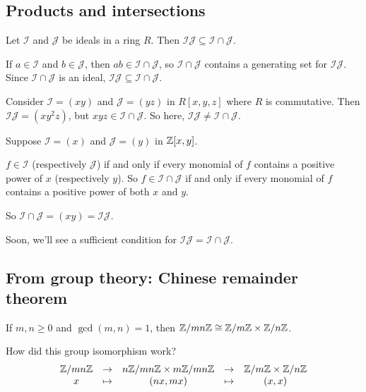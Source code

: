 \documentclass[12pt,letterpaper]{report}
\begin{document}
\pagebreak
\subsection{Products and intersections}

\begin{lem}{}{}
  Let $\mathcal{I}$ and $\mathcal{J}$ be ideals in a ring $R$.
  Then $\mathcal{IJ} \subseteq \mathcal{I} \cap \mathcal{J}$.
\end{lem}

\begin{thmproof}
  If $a \in \mathcal{I}$ and $b \in \mathcal{J}$, then $ab \in \mathcal{I} \cap \mathcal{J}$,
  so $\mathcal{I} \cap \mathcal{J}$ contains a generating set for $\mathcal{IJ}$.
  Since $\mathcal{I} \cap \mathcal{J}$ is an ideal,
  $\mathcal{IJ} \subseteq \mathcal{I} \cap \mathcal{J}$.
\end{thmproof}

\begin{ex}
  Consider $\mathcal{I} = (xy)$ and $\mathcal{J} = (yz)$ in $R[x, y, z]$ where $R$ is commutative.
  Then $\mathcal{IJ} = (xy^2z)$, but $xyz \in \mathcal{I} \cap \mathcal{J}$.
  So here, $\mathcal{IJ} \neq \mathcal{I} \cap \mathcal{J}$.
\end{ex}

\begin{ex}
  Suppose $\mathcal{I} = (x)$ and $\mathcal{J} = (y)$ in $\mathbb{Z}[x, y]$.

  $f \in \mathcal{I}$ (respectively $\mathcal{J}$) if and only if every monomial of $f$ contains a
  positive power of $x$ (respectively $y$).
  So $f \in \mathcal{I} \cap \mathcal{J}$ if and only if every monomial of $f$ contains a positive
  power of both $x$ and $y$.

  So $\mathcal{I} \cap \mathcal{J} = (xy) = \mathcal{IJ}$.
\end{ex}

Soon, we'll see a sufficient condition for $\mathcal{IJ} = \mathcal{I} \cap \mathcal{J}$.

\pagebreak
\subsection{From group theory: Chinese remainder theorem}

If $m, n \geq 0$ and $\gcd(m, n) = 1$, then $\mathbb{Z}/{mn}\mathbb{Z} \cong \mathbb{Z}/{m}\mathbb{Z} \times \mathbb{Z}/{n}\mathbb{Z}$.

How did this group isomorphism work?
\[
  \begin{array}{ccccc}
    \mathbb{Z}/{mn}\mathbb{Z} & \to & n\mathbb{Z}/mn\mathbb{Z} \times m\mathbb{Z}/mn\mathbb{Z} & \to & \mathbb{Z}/{m}\mathbb{Z} \times \mathbb{Z}/{n}\mathbb{Z} \\
    x & \mapsto & (nx, mx) & \mapsto & (x, x)
  \end{array}
\]
\end{document}
